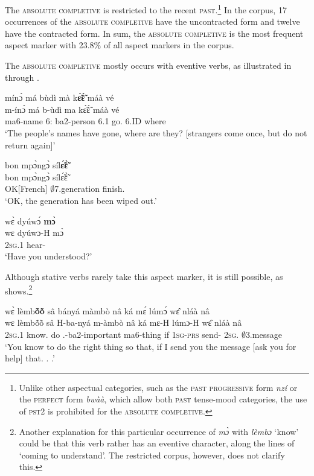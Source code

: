 The \textsc{absolute completive} is restricted to the recent \textsc{past}.\footnote{Unlike other aspectual categories, such as the \textsc{past} \textsc{progressive} form {\itshape nzí} or the \textsc{perfect} form {\itshape bwàà}, which allow both \textsc{past} tense-mood categories, the use of \textsc{pst2} is prohibited for the \textsc{absolute completive}.}
In the corpus, 17 occurrences of the \textsc{absolute completive} have the uncontracted form and twelve have the contracted form. In sum, the \textsc{absolute completive} is the most frequent aspect marker with 23.8\% of all aspect markers in the corpus.

The \textsc{absolute completive} mostly occurs with eventive verbs, as illustrated in  through .

\ea\label{mo3}
  \glll   mínɔ̀ má bùdì mà k{\bfseries ɛ̃́ɛ̃̀} máà vé \\
          m-ínɔ̀ má b-ùdì ma kɛ̃́ɛ̃̀ máà vé \\
            ma6-name 6:{\ATT} ba2-person 6.{\PST}1 go.{\COMPL} 6.ID where\\
    \trans `The people's names have gone, where are they? [strangers come once, but do not return again]'
\z

\ea\label{mo4}
  \glll bon mpɔ̀ngɔ̀ síl{\bfseries ɛ̃́ɛ̃̀}\\
        bon mpɔ̀ngɔ̀ sílɛ̃́ɛ̃̀ \\
      OK[French] $\emptyset$7.generation finish.{\COMPL} \\
    \trans `OK, the generation has been wiped out.'
\z

\ea\label{mo5}
  \glll wɛ̀ dyúwɔ́ {\bfseries mɔ̀}\\
       wɛ dyúwɔ-H mɔ̀ \\
      2\textsc{sg}.{\PST}1 hear-{\R} {\COMPL}   \\
    \trans `Have you understood?'
\z

Although stative verbs rarely take this aspect marker, it is still possible, as  shows.\footnote{Another explanation for this particular occurrence of {\itshape mɔ̀} with {\itshape lèmbɔ} `know' could be that this verb rather has an eventive character, along the lines of `coming to understand'. The restricted corpus, however, does not clarify this.}

\ea\label{mo6}
  \glll wɛ̀ lèmb{\bfseries ṍõ̀} sâ bányá màmbò nâ ká mɛ́ lúmɔ́ wɛ̂ nláà nâ \\
       wɛ lèmbṍõ̀ sâ H-ba-nyá m-àmbò nâ ká mɛ-H lúmɔ-H wɛ̂ nláà nâ \\
        2\textsc{sg}.{\PST}1 know.{\COMPL}  do {\OBJ}.{\LINK}-ba2-important ma6-thing {\COMP} if 1\textsc{sg}-\textsc{prs} send-{\R} 2\textsc{sg}.{\OBJ} $\emptyset$3.message {\COMP} \\
    \trans `You know to do the right thing so that, if I send you the message [ask you for help] that. . .'
\z

